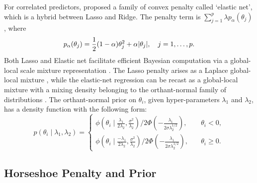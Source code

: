 \documentclass[11pt]{article}
\numberwithin{equation}{section}
\begin{document}
For correlated predictors, \cite{zou2005regularization} proposed a family of convex penalty called `elastic net', which is a hybrid between Lasso and Ridge. The penalty term is $\sum_{j=1}^{p} \lambda p_{\alpha}(\theta_j)$, where 
\[
p_{\alpha}(\theta_j) = \frac{1}{2} (1-\alpha)\theta_j^2 + \alpha \lvert\theta_j\rvert, \quad j = 1, \ldots, p. 
\]
Both Lasso and Elastic net facilitate efficient Bayesian computation via a global-local scale mixture representation \cite{bhadra2016global}. The Lasso penalty arises as a Laplace global-local mixture \citep{andrews1974scale}, while the elastic-net regression can be recast as a global-local mixture with a mixing density belonging to the orthant-normal family of distributions \citep{hans2011elastic}.  The orthant-normal prior on $\theta_i$, given hyper-parameters $\lambda_1$ and $\lambda_2$, 
has a density function with the following form:
\begin{equation}
  p(\theta_i \mid \lambda_1, \lambda_2)  = 
  \begin{cases} 
   \phi(\theta_i \mid \frac{\lambda_1}{2\lambda_2}, \frac{\sigma^2}{\lambda_2}) / 2\Phi\left(-\frac{\lambda_1}{2\sigma \lambda_2^{1/2} }\right), & \quad \theta_i < 0, \\
   \phi(\theta_i \mid \frac{-\lambda_1}{2\lambda_2}, \frac{\sigma^2}{\lambda_2}) / 2\Phi\left(-\frac{\lambda_1}{2\sigma \lambda_2^{1/2} }\right), & \quad \theta_i \geq 0. \end{cases} 
  \label{eq:hans}
\end{equation}
 

\subsection{Horseshoe Penalty and Prior}\label{sec:one-gp}

\end{document}
